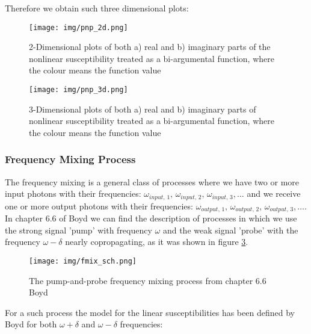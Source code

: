 \documentclass[12pt,twoside,a4paper]{article}
\numberwithin{equation}{subsection}
\numberwithin{figure}{subsection}
\begin{document}
Therefore we obtain such three dimensional plots:

\begin{figure} \label{fig:pnp_2d}
  \texttt{[image: img/pnp\_2d.png]}
  \caption{2-Dimensional plots of both a) real and b) imaginary parts of the nonlinear susceptibility treated as a bi-argumental
  function, where the colour means the function value}
\end{figure}

\begin{figure} \label{fig:pnp_3d}
  \texttt{[image: img/pnp\_3d.png]}
  \caption{3-Dimensional plots of both a) real and b) imaginary parts of nonlinear susceptibility treated as a bi-argumental
  function, where the colour means the function value}
\end{figure}

\subsubsection*{Frequency Mixing Process}

The frequency mixing is a general class of processes where we have two or more input photons with their frequencies:
${\omega_{input, \,1}}, \,{\omega_{input, \,2}}, \,{\omega_{input, \,3}}, \ldots $ and we receive one or more output photons with
their frequencies: ${\omega_{output, \,1}}, \,{\omega_{output,\,2}}, \,{\omega_{output, \,3}}, \ldots $. In chapter 6.6 of Boyd
\cite{boyd_nlo} we can find the description of processes in which we use the strong signal 'pump' with frequency $\omega$
and the weak signal 'probe' with the frequency $\omega  - \delta $ nearly copropagating, as it was shown in figure
\ref{fig:fmix_sch}.

\begin{figure} 
  \texttt{[image: img/fmix\_sch.png]}
  \caption{The pump-and-probe frequency mixing process from chapter 6.6 Boyd \cite{boyd_nlo} \label{fig:fmix_sch}}
\end{figure}

For a such process the model for the linear susceptibilities has been defined by Boyd for both $\omega  + \delta $ and $\omega  -
\delta $ frequencies:
\end{document}
